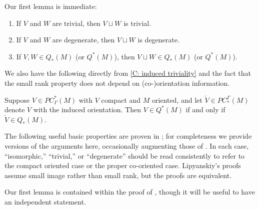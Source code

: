 Our first lemma is immediate:

\begin{lemma}\label{L: sum of trivial/degenerate}
	\begin{enumerate}
		\item If $V$ and $W$ are trivial, then $V \sqcup W$ is trivial.
		\item If $V$ and $W$ are degenerate, then $V \sqcup W$ is degenerate.
		\item If $V,W\in Q_*(M)$ (or $Q^*(M)$), then $V \sqcup W \in Q_*(M)$ (or $Q^*(M)$).
	\end{enumerate}
\end{lemma}

We also have the following directly from \cref{C: induced triviality} and the fact that the small rank property does not depend on (co-)orientation information.

\begin{lemma}\label{L: Q switch}
	Suppose $V \in PC^*_\Gamma(M)$ with $V$ compact and $M$ oriented, and let $\check V \in PC_*^\Gamma(M)$ denote $V$ with the induced orientation.
	Then $V \in Q^*(M)$ if and only if $\check V \in Q_*(M)$.
\end{lemma}

The following useful basic properties are proven in \cite{Lipy14}; for completeness we provide versions of the arguments here, occasionally augmenting those of \cite{Lipy14}.
In each case, ``isomorphic,'' ``trivial,'' or ``degenerate'' should be read consistently to refer to the compact oriented case or the proper co-oriented case.
Lipyanskiy's proofs assume small image rather than small rank, but the proofs are equivalent.

Our first lemma is contained within the proof of \cite[Lemma 10]{Lipy14}, though it will be useful to have an independent statement.

